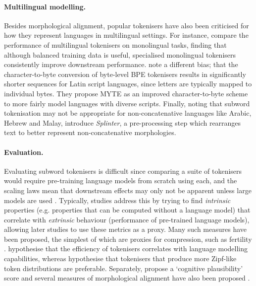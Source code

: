 \paragraph{Multilingual modelling.} Besides morphological alignment, popular tokenisers have also been criticised for how they represent languages in multilingual settings. For instance, \citet{rust-etal-2021} compare the performance of multilingual tokenisers on monolingual tasks, finding that although balanced training data is useful, specialised monolingual tokenisers consistently improve downstream performance. \citet{limisiewicz-etal-2024-myte} note a different bias; that the character-to-byte conversion of byte-level BPE tokenisers results in significantly shorter sequences for Latin script languages, since letters are typically mapped to individual bytes. They propose MYTE as an improved character-to-byte scheme to more fairly model languages with diverse scripts. Finally, noting that subword tokenisation may not be appropriate for non-concatenative languages like Arabic, Hebrew and Malay, \citet{gazit2025splinteringnonconcatenativelanguagesbetter} introduce \emph{Splinter}, a pre-processing step which rearranges text to better represent non-concatenative morphologies.

\paragraph{Evaluation.} Evaluating subword tokenisers is difficult since comparing a suite of tokenisers would require pre-training language models from scratch using each, and the scaling laws mean that downstream effects may only not be apparent unless large models are used \citep{wei2022emergent}. Typically, studies address this by trying to find \emph{intrinsic} properties (e.g. properties that can be computed without a language model) that correlate with \emph{extrinsic} behaviour (performance of pre-trained language models), allowing later studies to use these metrics as a proxy. Many such measures have been proposed, the simplest of which are proxies for compression, such as fertility \citep{acs2019exploring}. \citet{zouhar-etal-2023-tokenization} hypothesise that the \renyi efficiency of tokenisers correlates with language modelling capabilities, whereas \citet{lotz2025beyond} hypothesise that tokenisers that produce more Zipf-like token distributions are preferable. Separately, \citet{beinborn-pinter-2023-analyzing} propose a `cognitive plausibility' score and several measures of morphological alignment have also been proposed \citep{gow-smith-etal-2022-improving, batsuren2024evaluating, arnett2025language}.

